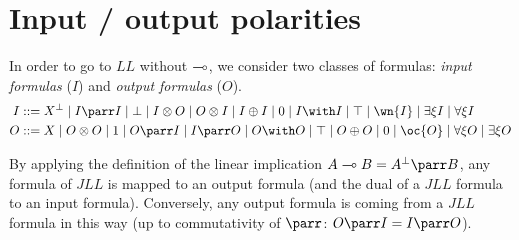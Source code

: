 \section{Input / output polarities}\label{input-output-polarities}

In order to go to \(LL\) without \(\multimap\), we consider two classes of
formulas: \emph{input formulas} (\(I\)) and \emph{output formulas}
(\(O\)).
\begin{align*}
I &::= X\orth \mid I\parr I \mid \bot \mid I\tens O \mid O\tens I \mid I\plus I \mid \zero \mid I\with I \mid \top \mid \wn{I} \mid \exists\xi I \mid \forall\xi I \\
O &::= X \mid O\tens O \mid \one \mid O\parr I \mid I\parr O \mid O\with O \mid \top \mid O\plus O \mid \zero \mid \oc{O} \mid \forall\xi O \mid \exists\xi O
\end{align*}

By applying the definition of the linear implication
\(A\limp B = A\orth\parr B\), any formula of \(JLL\) is mapped to an
output formula (and the dual of a \(JLL\) formula to an input formula).
Conversely, any output formula is coming from a \(JLL\) formula in this
way (up to commutativity of \(\parr\): \(O\parr I = I\parr O\)).

